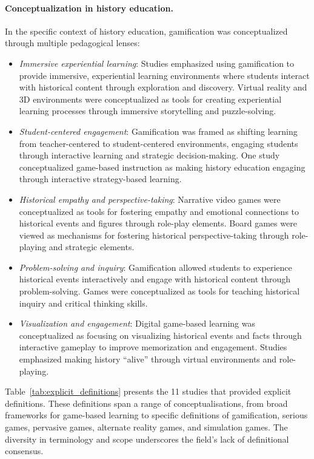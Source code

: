\documentclass[a4paper,fleqn]{cas-sc}
\begin{document}
\paragraph{Conceptualization in history education.}
In the specific context of history education, gamification was conceptualized through multiple pedagogical lenses:

\begin{itemize}[noitemsep]
 \item \textit{Immersive experiential learning}: Studies emphasized using gamification to provide immersive, experiential learning environments where students interact with historical content through exploration and discovery. Virtual reality and 3D environments were conceptualized as tools for creating experiential learning processes through immersive storytelling and puzzle-solving.
 
 \item \textit{Student-centered engagement}: Gamification was framed as shifting learning from teacher-centered to student-centered environments, engaging students through interactive learning and strategic decision-making. One study conceptualized game-based instruction as making history education engaging through interactive strategy-based learning.
 
 \item \textit{Historical empathy and perspective-taking}: Narrative video games were conceptualized as tools for fostering empathy and emotional connections to historical events and figures through role-play elements. Board games were viewed as mechanisms for fostering historical perspective-taking through role-playing and strategic elements.
 
 \item \textit{Problem-solving and inquiry}: Gamification allowed students to experience historical events interactively and engage with historical content through problem-solving. Games were conceptualized as tools for teaching historical inquiry and critical thinking skills.
 
 \item \textit{Visualization and engagement}: Digital game-based learning was conceptualized as focusing on visualizing historical events and facts through interactive gameplay to improve memorization and engagement. Studies emphasized making history ``alive'' through virtual environments and role-playing.
\end{itemize}

Table~\ref{tab:explicit_definitions} presents the 11 studies that provided explicit definitions. These definitions span a range of conceptualisations, from broad frameworks for game-based learning to specific definitions of gamification, serious games, pervasive games, alternate reality games, and simulation games. The diversity in terminology and scope underscores the field's lack of definitional consensus.
\end{document}
